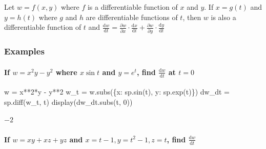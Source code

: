 \documentclass[
  letterpaper,
  DIV=11,
  numbers=noendperiod]{scrartcl}
\let\oldparagraph\paragraph
\renewcommand{\paragraph}[1]{\oldparagraph{#1}\mbox{}}
\newenvironment{Shaded}{\begin{snugshade}}{\end{snugshade}}
\newcommand{\DecValTok}[1]{\textcolor[rgb]{0.68,0.00,0.00}{#1}}
\newcommand{\NormalTok}[1]{\textcolor[rgb]{0.00,0.23,0.31}{#1}}
\newcommand{\OperatorTok}[1]{\textcolor[rgb]{0.37,0.37,0.37}{#1}}
\begin{document}
Let \(w = f(x, y)\) where \(f\) is a differentiable function of \(x\)
and \(y\). If \(x = g(t)\) and \(y = h(t)\) where \(g\) and \(h\) are
differentiable functions of \(t\), then \(w\) is also a differentiable
function of \(t\) and
\(\frac{\mathrm{d}w}{\mathrm{d}t} = \frac{\partial w}{\partial x}\cdot \frac{\mathrm{d}x}{\mathrm{d}t} + \frac{\partial w}{\partial y}\cdot \frac{\mathrm{d}y}{\mathrm{d}t}\)

\hypertarget{examples-8}{%
\subsubsection{Examples}\label{examples-8}}

\hypertarget{if-w-x2y-y2-where-xsin-t-and-yet-find-fracmathrmdwmathrmdt-at-t0}{%
\paragraph{\texorpdfstring{If \(w= x^2y-y^2\) where \(x\sin t\) and
\(y=e^t\), find \(\frac{\mathrm{d}w}{\mathrm{d}t}\) at
\(t=0\)}{If w= x\^{}2y-y\^{}2 where x\textbackslash sin t and y=e\^{}t, find \textbackslash frac\{\textbackslash mathrm\{d\}w\}\{\textbackslash mathrm\{d\}t\} at t=0}}\label{if-w-x2y-y2-where-xsin-t-and-yet-find-fracmathrmdwmathrmdt-at-t0}}

\begin{Shaded}
\begin{Highlighting}[numbers=left,,]
\NormalTok{w }\OperatorTok{=}\NormalTok{ x}\OperatorTok{**}\DecValTok{2}\OperatorTok{*}\NormalTok{y }\OperatorTok{{-}}\NormalTok{ y}\OperatorTok{**}\DecValTok{2}
\NormalTok{w\_t }\OperatorTok{=}\NormalTok{ w.subs(\{x: sp.sin(t), y: sp.exp(t)\})}
\NormalTok{dw\_dt }\OperatorTok{=}\NormalTok{ sp.diff(w\_t, t)}
\NormalTok{display(dw\_dt.subs(t, }\DecValTok{0}\NormalTok{))}
\end{Highlighting}
\end{Shaded}

$\displaystyle -2$

\hypertarget{if-w-xy-xz-yz-and-x-t-1-yt2-1-zt-find-fracmathrmdwmathrmdt}{%
\paragraph{\texorpdfstring{If \(w = xy + xz + yz\) and
\(x = t-1, y=t^2-1, z=t\), find
\(\frac{\mathrm{d}w}{\mathrm{d}t}\)}{If w = xy + xz + yz and x = t-1, y=t\^{}2-1, z=t, find \textbackslash frac\{\textbackslash mathrm\{d\}w\}\{\textbackslash mathrm\{d\}t\}}}\label{if-w-xy-xz-yz-and-x-t-1-yt2-1-zt-find-fracmathrmdwmathrmdt}}
\end{document}
